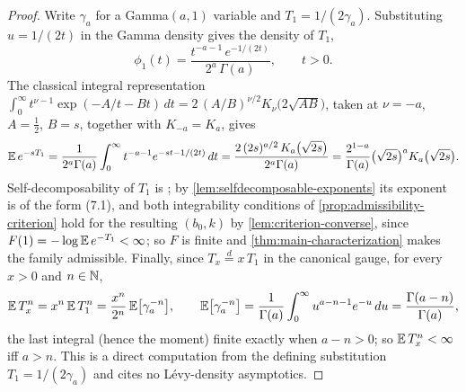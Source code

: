 \begin{proof}
Write $\gamma_a$ for a Gamma$(a,1)$ variable and $T_1 = 1/(2\gamma_a)$. Substituting
$u = 1/(2t)$ in the Gamma density gives the density of $T_1$,
\[
  \phi_1(t) = \frac{t^{-a-1}\,e^{-1/(2t)}}{2^{a}\,\Gamma(a)}, \qquad t > 0 .
\]
The classical integral representation
$\int_0^\infty t^{\nu-1}\exp(-A/t - Bt)\,dt = 2\,(A/B)^{\nu/2}K_\nu\bigl(2\sqrt{AB}\bigr)$,
taken at $\nu = -a$, $A = \tfrac12$, $B = s$, together with $K_{-a} = K_a$, gives
\[
  \mathbb{E}\,e^{-sT_1}
  = \frac{1}{2^{a}\Gamma(a)}\int_0^\infty t^{-a-1}e^{-st - 1/(2t)}\,dt
  = \frac{2\,(2s)^{a/2}\,K_a\bigl(\sqrt{2s}\bigr)}{2^{a}\Gamma(a)}
  = \frac{2^{1-a}}{\Gamma(a)}\bigl(\sqrt{2s}\bigr)^{a}K_a\bigl(\sqrt{2s}\bigr).
\]
Self-decomposability of $T_1$ is ; by
\ref{lem:selfdecomposable-exponents} its exponent is of the form (7.1), and both integrability
conditions of \ref{prop:admissibility-criterion} hold for the resulting $(b_0,k)$ by
\ref{lem:criterion-converse}, since $F(1) = -\log\mathbb{E}\,e^{-T_1} < \infty$; so $F$ is finite and
\ref{thm:main-characterization} makes the family admissible. Finally, since $T_x \stackrel{d}{=}
x\,T_1$ in the canonical gauge, for every $x > 0$ and $n \in \mathbb{N}$,
\[
  \mathbb{E}\,T_x^n = x^n\,\mathbb{E}\,T_1^n = \frac{x^n}{2^n}\,\mathbb{E}\bigl[\gamma_a^{-n}\bigr],
  \qquad
  \mathbb{E}\bigl[\gamma_a^{-n}\bigr]
  = \frac{1}{\Gamma(a)}\int_0^\infty u^{a-n-1}e^{-u}\,du
  = \frac{\Gamma(a-n)}{\Gamma(a)},
\]
the last integral (hence the moment) finite exactly when $a - n > 0$; so $\mathbb{E}\,T_x^n < \infty$ iff
$a > n$. This is a direct computation from the defining substitution $T_1 = 1/(2\gamma_a)$ and
cites no Lévy-density asymptotics.
\end{proof}

